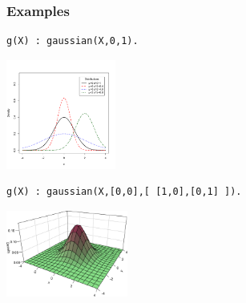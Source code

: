 \documentclass[trans]{beamer}
\begin{document}
\begin{frame}[fragile]
  \frametitle{Examples}
  \begin{center}
\begin{verbatim}
g(X) : gaussian(X,0,1).
\end{verbatim}
\includegraphics[width=0.27\textwidth]{normal.pdf}
\begin{verbatim}
g(X) : gaussian(X,[0,0],[ [1,0],[0,1] ]).
\end{verbatim}
\includegraphics[width=0.3\textwidth]{2dgauss.pdf}
\end{center}
\end{frame}
\end{document}
